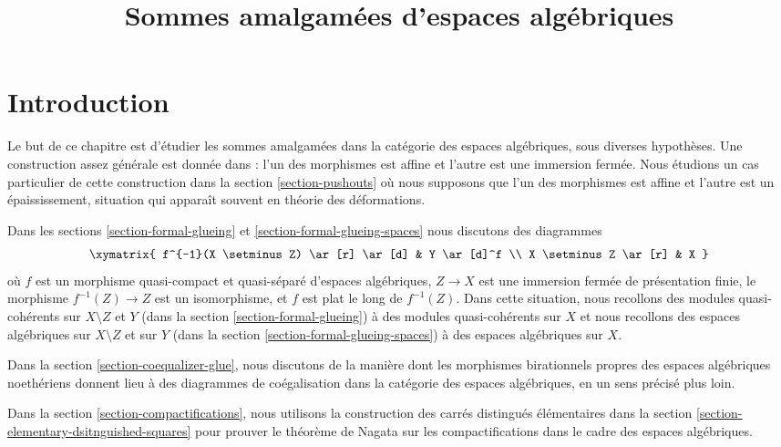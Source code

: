 

%


\title{Sommes amalgamées d'espaces algébriques}


\maketitle

\label{section-phantom}

\tableofcontents

\section{Introduction}
\label{section-introduction}

\noindent
Le but de ce chapitre est d'étudier les sommes amalgamées dans la catégorie des espaces algébriques, sous diverses hypothèses. Une construction assez générale est donnée dans \cite{Temkin-Tyomkin} : l'un des morphismes est affine et l'autre est une immersion fermée. Nous étudions un cas particulier de cette construction dans la section \ref{section-pushouts} où nous supposons que l'un des morphismes est affine et l'autre est un épaississement, situation qui apparaît souvent en théorie des déformations.

\medskip\noindent
Dans les sections \ref{section-formal-glueing} et
\ref{section-formal-glueing-spaces} nous discutons des diagrammes
$$
\xymatrix{
f^{-1}(X \setminus Z) \ar[r] \ar[d] & Y \ar[d]^f \\
X \setminus Z \ar[r] & X
}
$$
où $f$ est un morphisme quasi-compact et quasi-séparé d'espaces algébriques, $Z \to X$ est une immersion fermée de présentation finie, le morphisme $f^{-1}(Z) \to Z$ est un isomorphisme, et $f$ est plat le long de $f^{-1}(Z)$. Dans cette situation, nous recollons des modules quasi-cohérents sur $X \setminus Z$ et $Y$
(dans la section \ref{section-formal-glueing}) à des modules quasi-cohérents sur $X$
et nous recollons des espaces algébriques sur $X \setminus Z$ et sur $Y$
(dans la section \ref{section-formal-glueing-spaces}) à des espaces algébriques sur $X$.

\medskip\noindent
Dans la section \ref{section-coequalizer-glue}, nous discutons de la manière dont les morphismes birationnels propres des espaces algébriques noethériens donnent lieu à des diagrammes de coégalisation dans la catégorie des espaces algébriques, en un sens précisé plus loin.

\medskip\noindent
Dans la section \ref{section-compactifications}, nous utilisons la construction
des carrés distingués élémentaires
dans la section \ref{section-elementary-dsitnguished-squares}
pour prouver le théorème de Nagata sur les compactifications dans le cadre
des espaces algébriques.






